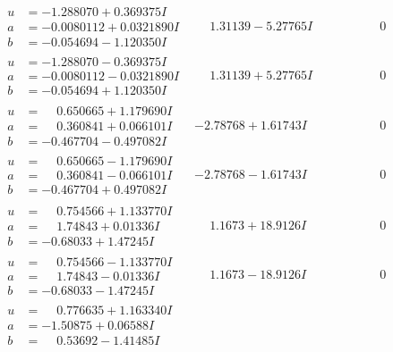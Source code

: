 \documentclass[1p]{elsarticle_modified}
\theoremstyle{definition}
\begin{document}
$$\begin{array}{c|c|c}
\begin{aligned}
u &= -1.288070 + 0.369375 I \\
a &= -0.0080112 + 0.0321890 I \\
b &= -0.054694 - 1.120350 I\end{aligned}
 & \phantom{-}1.31139 - 5.27765 I & \phantom{-0.000000 } 0 \\ \hline\begin{aligned}
u &= -1.288070 - 0.369375 I \\
a &= -0.0080112 - 0.0321890 I \\
b &= -0.054694 + 1.120350 I\end{aligned}
 & \phantom{-}1.31139 + 5.27765 I & \phantom{-0.000000 } 0 \\ \hline\begin{aligned}
u &= \phantom{-}0.650665 + 1.179690 I \\
a &= \phantom{-}0.360841 + 0.066101 I \\
b &= -0.467704 - 0.497082 I\end{aligned}
 & -2.78768 + 1.61743 I & \phantom{-0.000000 } 0 \\ \hline\begin{aligned}
u &= \phantom{-}0.650665 - 1.179690 I \\
a &= \phantom{-}0.360841 - 0.066101 I \\
b &= -0.467704 + 0.497082 I\end{aligned}
 & -2.78768 - 1.61743 I & \phantom{-0.000000 } 0 \\ \hline\begin{aligned}
u &= \phantom{-}0.754566 + 1.133770 I \\
a &= \phantom{-}1.74843 + 0.01336 I \\
b &= -0.68033 + 1.47245 I\end{aligned}
 & \phantom{-}1.1673 + 18.9126 I & \phantom{-0.000000 } 0 \\ \hline\begin{aligned}
u &= \phantom{-}0.754566 - 1.133770 I \\
a &= \phantom{-}1.74843 - 0.01336 I \\
b &= -0.68033 - 1.47245 I\end{aligned}
 & \phantom{-}1.1673 - 18.9126 I & \phantom{-0.000000 } 0 \\ \hline\begin{aligned}
u &= \phantom{-}0.776635 + 1.163340 I \\
a &= -1.50875 + 0.06588 I \\
b &= \phantom{-}0.53692 - 1.41485 I\end{aligned}

\end{array}$$
\end{document}
